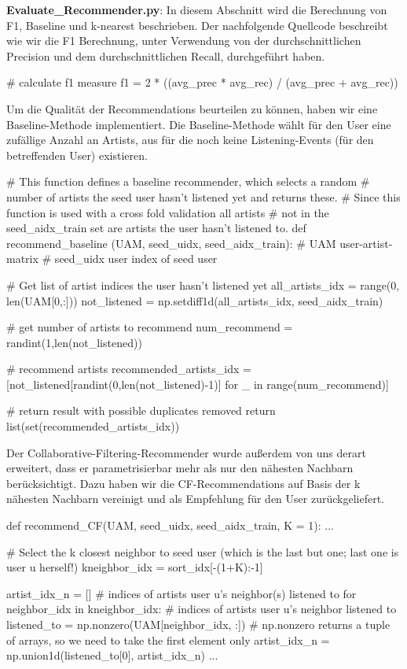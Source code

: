 \documentclass[prodmode,acmtecs]{acmsmall} %
\begin{document}
\textbf{Evaluate\_Recommender.py}: In diesem Abschnitt wird die Berechnung von F1, Baseline und k-nearest beschrieben.
Der nachfolgende Quellcode beschreibt wie wir die F1 Berechnung, unter Verwendung von der durchschnittlichen Precision und dem durchschnittlichen Recall, durchgeführt haben.

\begin{python}
	# calculate f1 measure
	f1 = 2 * ((avg_prec * avg_rec) / (avg_prec + avg_rec))
\end{python}

Um die Qualität der Recommendations beurteilen zu können, haben wir eine Baseline-Methode implementiert. Die Baseline-Methode wählt für den User eine zufällige Anzahl an Artists, aus für die noch keine Listening-Events (für den betreffenden User) existieren.

\begin{python}
# This function defines a baseline recommender, which selects a random 
# number of artists the seed user hasn't listened yet and returns these. 
# Since this function is used with a cross fold validation all artists 
# not in the seed_aidx_train set are artists the user hasn't listened to.
def recommend_baseline (UAM, seed_uidx, seed_aidx_train):
    # UAM               user-artist-matrix
    # seed_uidx         user index of seed user

    # Get list of artist indices the user hasn't listened yet
    all_artists_idx = range(0, len(UAM[0,:]))
    not_listened = np.setdiff1d(all_artists_idx, seed_aidx_train)

    # get number of artists to recommend
    num_recommend = randint(1,len(not_listened))

    # recommend artists
    recommended_artists_idx = [not_listened[randint(0,len(not_listened)-1)] for _ in range(num_recommend)]

    # return result with possible duplicates removed
    return list(set(recommended_artists_idx))
\end{python}

Der Collaborative-Filtering-Recommender wurde außerdem von uns derart erweitert, dass er parametrisierbar mehr als nur den nähesten Nachbarn berücksichtigt. Dazu haben wir die CF-Recommendations auf Basis der k nähesten Nachbarn vereinigt und als Empfehlung für den User zurückgeliefert.

\begin{python}
def recommend_CF(UAM, seed_uidx, seed_aidx_train, K = 1):
    ...

    # Select the k closest neighbor to seed user (which is the last but one; last one is user u herself!)
    kneighbor_idx = sort_idx[-(1+K):-1]

    artist_idx_n = [] # indices of artists user u's neighbor(s) listened to
    for neighbor_idx in kneighbor_idx:
        # indices of artists user u's neighbor listened to
        listened_to = np.nonzero(UAM[neighbor_idx, :])
        # np.nonzero returns a tuple of arrays, so we need to take the first element only
        artist_idx_n = np.union1d(listened_to[0], artist_idx_n)
    ...
\end{python}
\end{document}
